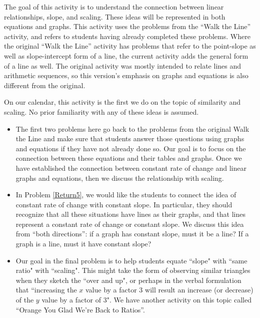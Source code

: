 \documentclass[nooutcomes]{ximera}
\begin{document}
\newpage
\begin{instructorNotes}
The goal of this activity is to understand the connection between linear relationships, slope, and scaling.  These ideas will be represented in both equations and graphs.  This activity uses the problems from the ``Walk the Line'' activity, and refers to students having already completed these problems.  Where the original ``Walk the Line'' activity has problems that refer to the point-slope as well as slope-intercept form of a line, the current activity adds the general form of a line as well.  The original activity was mostly intended to relate lines and arithmetic sequences, so this version's emphasis on graphs and equations is also different from the original.

On our calendar, this activity is the first we do on the topic of similarity and scaling.  No prior familiarity with any of these ideas is assumed. 




 \begin{itemize}
    \item The first two problems here go back to the problems from the original Walk the Line and make sure that students answer those questions using graphs and equations if they have not already done so.  Our goal is to focus on the connection between these equations and their tables and graphs. Once we have established the connection between constant rate of change and linear graphs and equations, then we discuss the relationship with scaling.
    \item In Problem \ref{Return5}, we would like the students to connect the idea of constant rate of change with constant slope.  In particular, they should recognize that all these situations have lines as their graphs, and that lines represent a constant rate of change or constant slope. We discuss this idea from ``both directions'': if a graph has constant slope, must it be a line?  If a graph is a line, must it have constant slope?
    \item Our goal in the final problem is to help students equate ``slope" with ``same ratio" with ``scaling".  This might take the form of observing similar triangles when they sketch the ``over and up", or perhaps in the verbal formulation that ``increasing the $x$ value by a factor 3 will result an increase (or decrease) of the $y$ value by a factor of 3".  We have another activity on this topic called ``Orange You Glad We're Back to Ratios''.
\end{itemize}



\end{instructorNotes}
\end{document}
